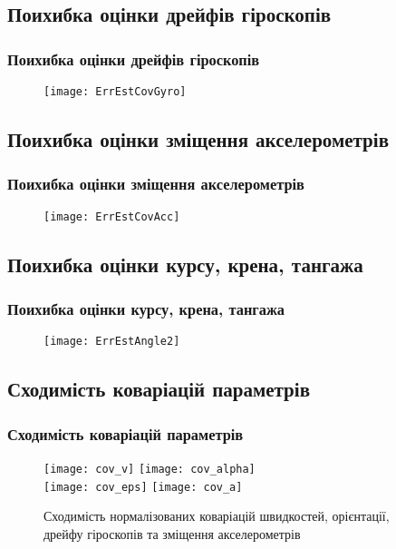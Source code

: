 \documentclass[ucs,compress]{beamer}    %
\begin{document}
\subsection{Поихибка оцінки дрейфів гіроскопів} 
\begin{frame}%
\frametitle{Поихибка оцінки дрейфів гіроскопів}
\noindent
\begin{figure}
\texttt{[image: ErrEstCovGyro]}
\end{figure}
\end{frame}

\subsection{Поихибка оцінки зміщення акселерометрів} 
\begin{frame}%
\frametitle{Поихибка оцінки зміщення акселерометрів}
\begin{figure}
\centering
\texttt{[image: ErrEstCovAcc]}
\end{figure}
\end{frame}
\subsection{Поихибка оцінки курсу, крена, тангажа} 
\begin{frame}%
\frametitle{Поихибка оцінки курсу, крена, тангажа}
\begin{figure}
\centering
\texttt{[image: ErrEstAngle2]}
\end{figure}
\end{frame}
\subsection{Сходимість коваріацій параметрів} 
\begin{frame}%
\frametitle{Сходимість коваріацій параметрів}
\begin{figure}
\centering
\texttt{[image: cov\_v]}
\texttt{[image: cov\_alpha]}\\
\texttt{[image: cov\_eps]}
\texttt{[image: cov\_a]}
\caption{\tiny Сходимість нормалізованих коваріацій швидкостей, орієнтації, дрейфу гіроскопів та зміщення акселерометрів}
\end{figure}
\end{frame}
\end{document}
